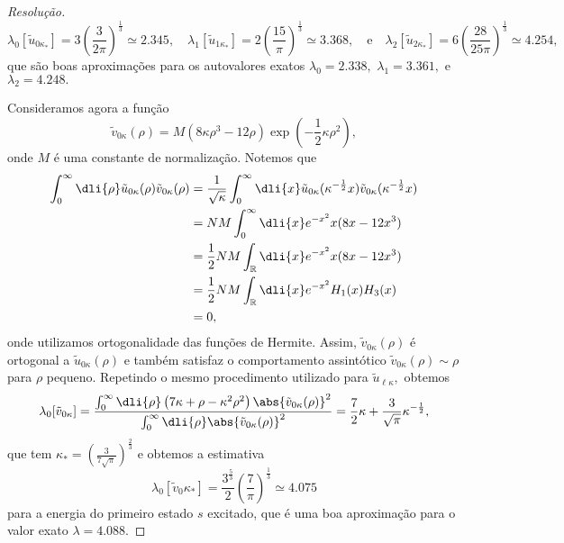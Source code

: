 \begin{proof}[Resolução]
   \begin{equation*}
      \lambda_{0}[\tilde{u}_{0\kappa_*}] = 3\left(\frac{3}{2\pi}\right)^{\frac13} \simeq 2.345,\quad
      \lambda_{1}[\tilde{u}_{1\kappa_*}] = 2\left(\frac{15}{\pi}\right)^{\frac13} \simeq 3.368,\quad\text{e}\quad
      \lambda_{2}[\tilde{u}_{2\kappa_*}] = 6\left(\frac{28}{25\pi}\right)^{\frac13} \simeq 4.254,
   \end{equation*}
   que são boas aproximações para os autovalores exatos \(\lambda_0 = 2.338,\) \(\lambda_1 = 3.361,\) e \(\lambda_2 = 4.248.\)

   Consideramos agora a função
   \begin{equation*}
      \tilde{v}_{0 \kappa}(\rho) = M\left(8\kappa\rho^3 - 12 \rho\right) \exp\left(-\frac12\kappa \rho^2\right),
   \end{equation*}
   onde \(M\) é uma constante de normalização. Notemos que
   \begin{align*}
      \int_0^\infty \dli{\rho} \tilde{u}_{0 \kappa}(\rho) \tilde{v}_{0 \kappa} (\rho) 
      &= \frac{1}{\sqrt{\kappa}}\int_0^\infty \dli{x} \tilde{u}_{0 \kappa}(\kappa^{-\frac12} x) \tilde{v}_{0 \kappa}(\kappa^{-\frac12} x)\\
      &= NM\int_0^{\infty} \dli{x} e^{-x^2} x (8 x - 12 x^3)\\
      &= \frac12 NM \int_{\mathbb{R}} \dli{x} e^{-x^2} x (8 x - 12 x^3)\\
      &= \frac12 NM \int_{\mathbb{R}} \dli{x} e^{-x^2} H_1(x) H_3(x)\\
      &= 0,
   \end{align*}
   onde utilizamos ortogonalidade das funções de Hermite. Assim, \(\tilde{v}_{0 \kappa}(\rho)\) é ortogonal a \(\tilde{u}_{0 \kappa}(\rho)\) e também satisfaz o comportamento assintótico \(\tilde{v}_{0 \kappa}(\rho) \sim \rho\) para \(\rho\) pequeno. Repetindo o mesmo procedimento utilizado para \(\tilde{u}_{\ell \kappa},\) obtemos
   \begin{equation*}
      \lambda_0[\tilde{v}_{0 \kappa}] = \frac{\int_0^\infty\dli{\rho} \left(7 \kappa + \rho - \kappa^2 \rho^2\right)\abs{\tilde{v}_{0 \kappa}(\rho)}^2}{\int_0^\infty \dli{\rho} \abs{\tilde{v}_{0 \kappa}(\rho)}^2} = \frac{7}{2} \kappa + \frac{3}{\sqrt{\pi}} \kappa^{-\frac12},
   \end{equation*}
   que tem \(\kappa_* = \left(\frac{3}{7\sqrt{\pi}}\right)^{\frac23}\) e obtemos a estimativa 
   \begin{equation*}
      \lambda_0[\tilde{v}_0{\kappa_*}] = \frac{3^{\frac53}}{2} \left(\frac{7}{\pi}\right)^{\frac13} \simeq 4.075
   \end{equation*}
   para a energia do primeiro estado \(s\) excitado, que é uma boa aproximação para o valor exato \(\lambda = 4.088.\)
\end{proof}
